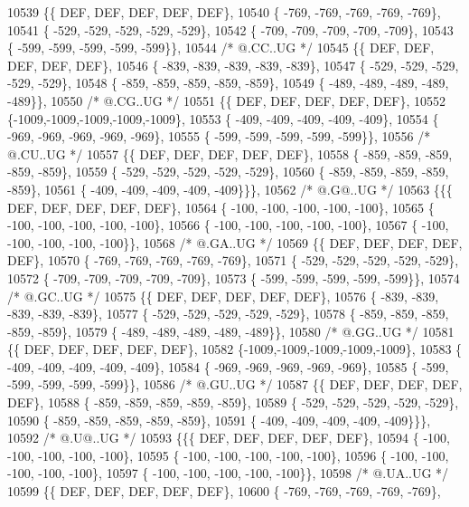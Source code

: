 \begin{DoxyCode}
10539 \{\{  DEF,  DEF,  DEF,  DEF,  DEF\},
10540 \{ -769, -769, -769, -769, -769\},
10541 \{ -529, -529, -529, -529, -529\},
10542 \{ -709, -709, -709, -709, -709\},
10543 \{ -599, -599, -599, -599, -599\}\},
10544 \textcolor{comment}{/*  @.CC..UG */}
10545 \{\{  DEF,  DEF,  DEF,  DEF,  DEF\},
10546 \{ -839, -839, -839, -839, -839\},
10547 \{ -529, -529, -529, -529, -529\},
10548 \{ -859, -859, -859, -859, -859\},
10549 \{ -489, -489, -489, -489, -489\}\},
10550 \textcolor{comment}{/*  @.CG..UG */}
10551 \{\{  DEF,  DEF,  DEF,  DEF,  DEF\},
10552 \{-1009,-1009,-1009,-1009,-1009\},
10553 \{ -409, -409, -409, -409, -409\},
10554 \{ -969, -969, -969, -969, -969\},
10555 \{ -599, -599, -599, -599, -599\}\},
10556 \textcolor{comment}{/*  @.CU..UG */}
10557 \{\{  DEF,  DEF,  DEF,  DEF,  DEF\},
10558 \{ -859, -859, -859, -859, -859\},
10559 \{ -529, -529, -529, -529, -529\},
10560 \{ -859, -859, -859, -859, -859\},
10561 \{ -409, -409, -409, -409, -409\}\}\},
10562 \textcolor{comment}{/*  @.G@..UG */}
10563 \{\{\{  DEF,  DEF,  DEF,  DEF,  DEF\},
10564 \{ -100, -100, -100, -100, -100\},
10565 \{ -100, -100, -100, -100, -100\},
10566 \{ -100, -100, -100, -100, -100\},
10567 \{ -100, -100, -100, -100, -100\}\},
10568 \textcolor{comment}{/*  @.GA..UG */}
10569 \{\{  DEF,  DEF,  DEF,  DEF,  DEF\},
10570 \{ -769, -769, -769, -769, -769\},
10571 \{ -529, -529, -529, -529, -529\},
10572 \{ -709, -709, -709, -709, -709\},
10573 \{ -599, -599, -599, -599, -599\}\},
10574 \textcolor{comment}{/*  @.GC..UG */}
10575 \{\{  DEF,  DEF,  DEF,  DEF,  DEF\},
10576 \{ -839, -839, -839, -839, -839\},
10577 \{ -529, -529, -529, -529, -529\},
10578 \{ -859, -859, -859, -859, -859\},
10579 \{ -489, -489, -489, -489, -489\}\},
10580 \textcolor{comment}{/*  @.GG..UG */}
10581 \{\{  DEF,  DEF,  DEF,  DEF,  DEF\},
10582 \{-1009,-1009,-1009,-1009,-1009\},
10583 \{ -409, -409, -409, -409, -409\},
10584 \{ -969, -969, -969, -969, -969\},
10585 \{ -599, -599, -599, -599, -599\}\},
10586 \textcolor{comment}{/*  @.GU..UG */}
10587 \{\{  DEF,  DEF,  DEF,  DEF,  DEF\},
10588 \{ -859, -859, -859, -859, -859\},
10589 \{ -529, -529, -529, -529, -529\},
10590 \{ -859, -859, -859, -859, -859\},
10591 \{ -409, -409, -409, -409, -409\}\}\},
10592 \textcolor{comment}{/*  @.U@..UG */}
10593 \{\{\{  DEF,  DEF,  DEF,  DEF,  DEF\},
10594 \{ -100, -100, -100, -100, -100\},
10595 \{ -100, -100, -100, -100, -100\},
10596 \{ -100, -100, -100, -100, -100\},
10597 \{ -100, -100, -100, -100, -100\}\},
10598 \textcolor{comment}{/*  @.UA..UG */}
10599 \{\{  DEF,  DEF,  DEF,  DEF,  DEF\},
10600 \{ -769, -769, -769, -769, -769\},

\end{DoxyCode}
